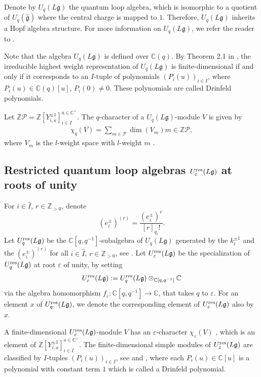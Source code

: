 \documentclass[12pt, reqno]{amsart}
\numberwithin{equation}{section}
\newcommand{\CC}{\mathbb{C}}
\newcommand{\res}{{\rm res}}
\begin{document}
Denote by $U_q({L\mathfrak{g}})$ the quantum loop algebra, which is isomorphic to a quotient of $U_q(\widehat{\mathfrak{g}})$ where the central charge is mapped to $1$. Therefore, $U_q({L\mathfrak{g}})$ inherits a Hopf algebra structure. For more information on $U_q({L\mathfrak{g}})$, we refer the reader to \cite{CH10, CP94, CP95, Le11}.


Note that the algebra $U_q({L\mathfrak{g}})$ is defined over $\CC(q)$. By Theorem 2.1 in \cite{CP97b}, the irreducible highest weight representation of $U_q({L\mathfrak{g}})$ is finite-dimensional if and only if it corresponds to an $I$-tuple of polynomials $(P_i(u))_{i\in I}$, where $P_i(u) \in \CC(q)[u]$, $P_i(0) \ne 0$. These polynomials are called Drinfeld polynomials.

Let $\mathbb{Z}\mathcal{P} = \mathbb{Z}[Y_{i,a}^{\pm1}]_{i\in I}^{a\in\mathbb{C^{\times}}}$. The $q$-character of a $U_q(L\mathfrak{g})$-module $V$ is given by
\begin{align*}
\chi_q(V) = \sum_{m \in \mathcal{P}} \dim(V_{m}) m \in \mathbb{Z}\mathcal{P},
\end{align*}
where $V_m$ is the $l$-weight space with $l$-weight $m$ \cite{FR98}.


\subsection{Restricted quantum loop algebras $U_\varepsilon^{\res}({L\mathfrak{g}})$ at roots of unity}
For $i \in \hat{I}$, $r \in \mathbb{Z}_{>0}$, denote
\[
(e_i^{\pm})^{(r)}=\frac{(e_i^{\pm})^r}{[r]_{q_i}!}.
\]
Let $U_q^{\res}({L\mathfrak{g}})$ be the $\mathbb{C}[q, q^{-1}]$-subalgebra of $U_q({L\mathfrak{g}})$ generated by the $k_i^{\pm 1}$ and the $(e_i^{\pm})^{(r)}$ for all $i \in \hat{I}$, $r \in \mathbb{Z}_{>0}$, see \cite[Section 1]{CP97b}.
Let $U_\varepsilon^{\res}({L\mathfrak{g}})$ be the specialization of $U_q^{\res}({L\mathfrak{g}})$ at root $\varepsilon$ of unity, by setting
\begin{align*}
U_\varepsilon^{\res}({L\mathfrak{g}}):=U_q^{\res}({L\mathfrak{g}}) \otimes_{\mathbb{C}[q, q^{-1}]}\mathbb{C}
\end{align*}
via the algebra homomorphism $f_{\varepsilon}: \mathbb{C}[q, q^{-1}]\rightarrow \mathbb{C}$, that takes $q$ to $\varepsilon$.
For an element $x$ of $U_q^{\res}({L\mathfrak{g}})$, we denote the corresponding element of $U_\varepsilon^{\res}({L\mathfrak{g}})$ also by $x$.

A finite-dimensional $U_\varepsilon^{\res}({L\mathfrak{g}})$-module $V$ has an $\varepsilon$-character $\chi_{\varepsilon}(V)$ \cite[Section 3]{FM02}, which is an element of $\mathbb{Z}[Y_{i,a}^{\pm1}]_{i\in I}^{a\in\mathbb{C^{\times}}}$. The finite-dimensional simple modules of $U_{\varepsilon}^{\res}(L\mathfrak{g})$ are classified by $I$-tuples $(P_i(u))_{i \in I}$, see \cite[Theorem 8.2]{CP97b} and \cite[Theorem 2.4]{FM02}, where each $P_i(u) \in \mathbb{C}[u]$ is a polynomial with constant term $1$ which is called a Drinfeld polynomial. 
\end{document}
